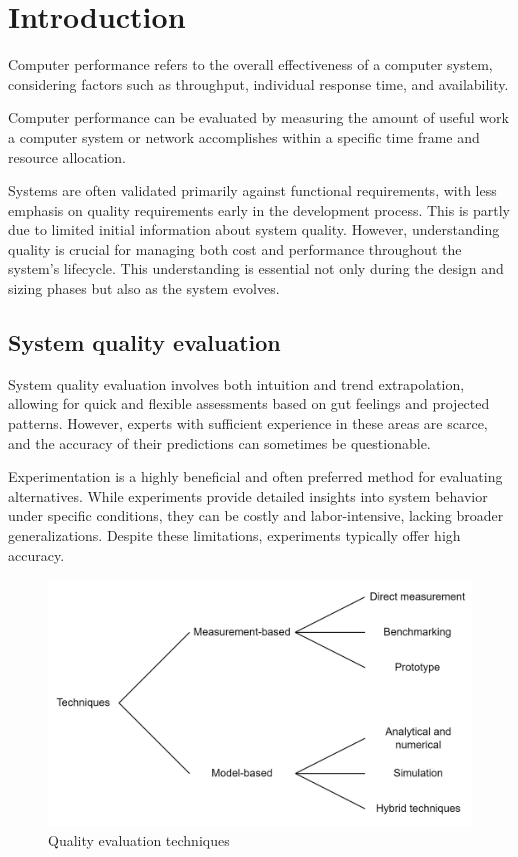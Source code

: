 \section{Introduction}

\begin{definition}
    Computer performance refers to the overall effectiveness of a computer system, considering factors such as throughput, individual response time, and availability.
\end{definition}
Computer performance can be evaluated by measuring the amount of useful work a computer system or network accomplishes within a specific time frame and resource allocation.

Systems are often validated primarily against functional requirements, with less emphasis on quality requirements early in the development process. 
This is partly due to limited initial information about system quality. 
However, understanding quality is crucial for managing both cost and performance throughout the system's lifecycle. 
This understanding is essential not only during the design and sizing phases but also as the system evolves.

\subsection{System quality evaluation}
System quality evaluation involves both intuition and trend extrapolation, allowing for quick and flexible assessments based on gut feelings and projected patterns. 
However, experts with sufficient experience in these areas are scarce, and the accuracy of their predictions can sometimes be questionable.

Experimentation is a highly beneficial and often preferred method for evaluating alternatives. 
While experiments provide detailed insights into system behavior under specific conditions, they can be costly and labor-intensive, lacking broader generalizations.
Despite these limitations, experiments typically offer high accuracy.
\begin{figure}[H]
    \centering
    \includegraphics[width=0.5\linewidth]{images/eva.png}
    \caption{Quality evaluation techniques}
\end{figure}

